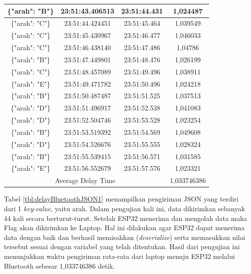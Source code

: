 \begin{longtable}{|ccc|c|}
  \multicolumn{1}{|c|}{\{"arah": "B"\}} & \multicolumn{1}{c|}{23:51:43.406513} & 23:51:44.431       & 1,024487    \\ \hline
  \multicolumn{1}{|c|}{\{"arah": "C"\}} & \multicolumn{1}{c|}{23:51:44.424451} & 23:51:45.464       & 1,039549    \\ \hline
  \multicolumn{1}{|c|}{\{"arah": "C"\}} & \multicolumn{1}{c|}{23:51:45.430967} & 23:51:46.477       & 1,046033    \\ \hline
  \multicolumn{1}{|c|}{\{"arah": "C"\}} & \multicolumn{1}{c|}{23:51:46.438140} & 23:51:47.486       & 1,04786     \\ \hline
  \multicolumn{1}{|c|}{\{"arah": "B"\}} & \multicolumn{1}{c|}{23:51:47.449801} & 23:51:48.476       & 1,026199    \\ \hline
  \multicolumn{1}{|c|}{\{"arah": "C"\}} & \multicolumn{1}{c|}{23:51:48.457089} & 23:51:49.496       & 1,038911    \\ \hline
  \multicolumn{1}{|c|}{\{"arah": "E"\}} & \multicolumn{1}{c|}{23:51:49.471782} & 23:51:50.496       & 1,024218    \\ \hline
  \multicolumn{1}{|c|}{\{"arah": "B"\}} & \multicolumn{1}{c|}{23:51:50.487487} & 23:51:51.525       & 1,037513    \\ \hline
  \multicolumn{1}{|c|}{\{"arah": "D"\}} & \multicolumn{1}{c|}{23:51:51.496917} & 23:51:52.538       & 1,041083    \\ \hline
  \multicolumn{1}{|c|}{\{"arah": "D"\}} & \multicolumn{1}{c|}{23:51:52.504746} & 23:51:53.528       & 1,023254    \\ \hline
  \multicolumn{1}{|c|}{\{"arah": "B"\}} & \multicolumn{1}{c|}{23:51:53.519392} & 23:51:54.569       & 1,049608    \\ \hline
  \multicolumn{1}{|c|}{\{"arah": "D"\}} & \multicolumn{1}{c|}{23:51:54.526676} & 23:51:55.555       & 1,028324    \\ \hline
  \multicolumn{1}{|c|}{\{"arah": "B"\}} & \multicolumn{1}{c|}{23:51:55.539415} & 23:51:56.571       & 1,031585    \\ \hline
  \multicolumn{1}{|c|}{\{"arah": "E"\}} & \multicolumn{1}{c|}{23:51:56.552679} & 23:51:57.576       & 1,023321    \\ \hline
  \multicolumn{3}{|c|}{Average Delay Time}                                                          & 1,033746386 \\ \hline
  \end{longtable}

Tabel \ref{tbl:delayBluetoothJSON1} menampilkan pengiriman JSON yang terdiri dari 1 \emph{key}-\emph{value}, yaitu arah. Dalam pengujian kali ini, data dikirimkan sebanyak 44 kali secara berturut-turut. Setelah ESP32 menerima dan mengolah data maka Flag akan dikirimkan ke Laptop. Hal ini dilakukan agar ESP32 dapat menerima data dengan baik dan berhasil memisahkan (\emph{deserialize}) serta memasukkan nilai tersebut sesuai dengan variabel yang telah ditentukan. Hasil dari pengujian ini menunjukkan waktu pengiriman rata-rata dari laptop menuju ESP32 melalui Bluetooth sebesar 1,033746386 detik.

